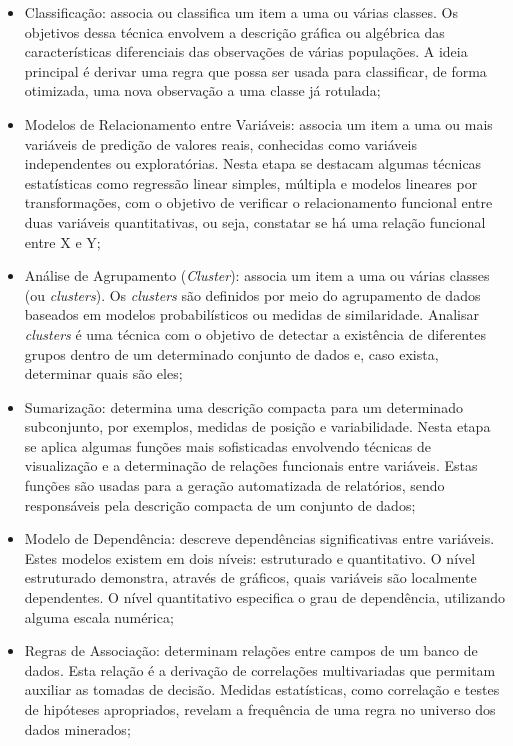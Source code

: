 \begin{itemize}
	\item Classificação: associa ou classifica um item a uma ou várias classes. Os objetivos dessa técnica envolvem a descrição gráfica ou algébrica das características diferenciais das observações de várias populações. A ideia principal é derivar uma regra que possa ser usada para classificar, de forma otimizada, uma nova observação a uma classe já rotulada;
	
	\item Modelos de Relacionamento entre Variáveis: associa um item a uma ou mais variáveis de predição de valores reais, conhecidas como variáveis independentes ou exploratórias. Nesta etapa se destacam algumas técnicas estatísticas como regressão linear simples, múltipla e modelos lineares por transformações, com o objetivo de verificar o relacionamento funcional entre duas variáveis quantitativas, ou seja, constatar se há uma relação funcional entre X e Y;
	
	\item Análise de Agrupamento (\textit{Cluster}): associa um item a uma ou várias classes (ou \textit{clusters}). Os \textit{clusters} são definidos por meio do agrupamento de dados baseados em modelos probabilísticos ou medidas de similaridade. Analisar \textit{clusters} é uma técnica com o objetivo de detectar a existência de diferentes grupos dentro de um determinado conjunto de dados e, caso exista, determinar quais são eles;
	
	\item Sumarização: determina uma descrição compacta para um determinado subconjunto, por exemplos, medidas de posição e variabilidade. Nesta etapa se aplica algumas funções mais sofisticadas envolvendo técnicas de visualização e a determinação de relações funcionais entre variáveis. Estas funções são usadas para a geração automatizada de relatórios, sendo responsáveis pela descrição compacta de um conjunto de dados;
	
	\item Modelo de Dependência: descreve dependências significativas entre variáveis. Estes modelos existem em dois níveis: estruturado e quantitativo. O nível estruturado demonstra, através de gráficos, quais variáveis são localmente dependentes. O nível quantitativo especifica o grau de dependência, utilizando alguma escala numérica;
	
	\item Regras de Associação: determinam relações entre campos de um banco de dados. Esta relação é a derivação de correlações multivariadas que permitam auxiliar as tomadas de decisão. Medidas estatísticas, como correlação e testes de hipóteses apropriados, revelam a frequência de uma regra no universo dos dados minerados;
	

\end{itemize}
